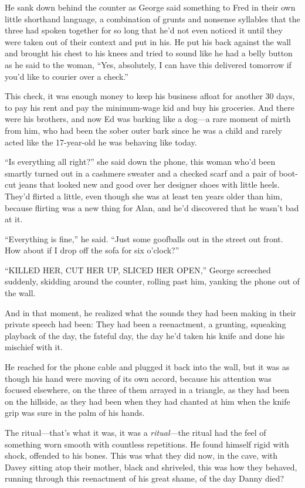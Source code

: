 He sank down behind the counter as George said something to Fred in
their own little shorthand language, a combination of grunts and
nonsense syllables that the three had spoken together for so long that
he'd not even noticed it until they were taken out of their context
and put in his.  He put his back against the wall and brought his
chest to his knees and tried to sound like he had a belly button as he
said to the woman, ``Yes, absolutely, I can have this delivered
tomorrow if you'd like to courier over a check.''

This check, it was enough money to keep his business afloat for
another 30 days, to pay his rent and pay the minimum-wage kid and buy
his groceries.  And there were his brothers, and now Ed was barking
like a dog---a rare moment of mirth from him, who had been the sober
outer bark since he was a child and rarely acted like the 17-year-old
he was behaving like today.

``Is everything all right?'' she said down the phone, this woman who'd
been smartly turned out in a cashmere sweater and a checked scarf and
a pair of boot-cut jeans that looked new and good over her designer
shoes with little heels.  They'd flirted a little, even though she was
at least ten years older than him, because flirting was a new thing
for Alan, and he'd discovered that he wasn't bad at it.

``Everything is fine,'' he said.  ``Just some goofballs out in the
street out front.  How about if I drop off the sofa for six o'clock?''

``KILLED HER, CUT HER UP, SLICED HER OPEN,'' George screeched
suddenly, skidding around the counter, rolling past him, yanking the
phone out of the wall.

And in that moment, he realized what the sounds they had been making
in their private speech had been:  They had been a reenactment, a
grunting, squeaking playback of the day, the fateful day, the day he'd
taken his knife and done his mischief with it.

He reached for the phone cable and plugged it back into the wall, but
it was as though his hand were moving of its own accord, because his
attention was focused elsewhere, on the three of them arrayed in a
triangle, as they had been on the hillside, as they had been when they
had chanted at him when the knife grip was sure in the palm of his
hands.

The ritual---that's what it was, it was a \textit{ritual}---the ritual
had the feel of something worn smooth with countless repetitions.  He
found himself rigid with shock, offended to his bones.  This was what
they did now, in the cave, with Davey sitting atop their mother, black
and shriveled, this was how they behaved, running through this
reenactment of his great shame, of the day Danny died?

